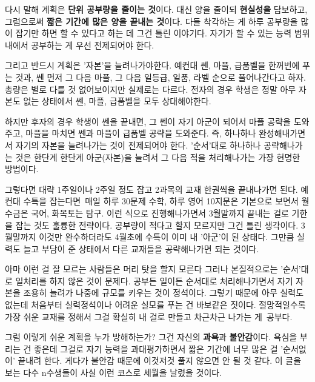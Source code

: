 다시 말해 계획은 \textbf{단위 공부량을 줄이는 것}이다.
대신 양을 줄이되 \textbf{현실성을} 담보하고, 그럼으로써 \textbf{짧은 기간에 많은 양을 끝내는 것}이다.
다들 착각하는 게 하루 공부량을 많이 잡기만 하면 할 수 있다고 하는 데 그건 틀린 이야기다.
자기가 할 수 있는 능력 범위 내에서 공부하는 게 우선 전제되어야 한다.
\vspace{5mm}

그리고 반드시 계획은 '자본'을 늘려나가야한다.
예컨대 쎈, 마플, 급품벨을 한꺼번에 푸는 것과, 쎈 먼저 그 다음 마플, 그 다음 일등급, 일품, 라벨 순으로 풀어나간다고 하자.
총량은 별로 다를 것 없어보이지만 실제로는 다르다.
전자의 경우 학생은 정말 아무 자본도 없는 상태에서 쎈, 마플, 급품벨을 모두 상대해야한다.
\vspace{5mm}

하지만 후자의 경우 학생이 쎈을 끝내면, 그 쎈이 자기 아군이 되어서 마플 공략을 도와주고, 마플을 마치면 쎈과 마플이 급품벨 공략을 도와준다.
즉, 하나하나 완성해내가면서 자기의 자본을 늘려나가는 것이 전제되어야 한다.
'순서'대로 하나하나 공략해나가는 것은 한단계 한단계 아군(자본)을 늘려서 그 다음 적을 처리해나가는 가장 현명한 방법이다.
\vspace{5mm}

그렇다면 대략 1주일이나 2주일 정도 잡고 2과목의 교재 한권씩을 끝내나가면 된다.
예컨대 수특을 잡는다면 매일 하루 30문제 수학, 하루 영어 10지문은 기본으로 보면서 월수금은 국어, 화목토는 탐구.
이런 식으로 진행해나가면서 3월말까지 끝내는 걸로 기한을 잡는 것도 훌륭한 전략이다.
공부량이 적다고 할지 모르지만 그건 틀린 생각이다. 3월말까지 이것만 완수하더라도 4월초에 수특이 이미 내 '아군'이 된 상태다.
그만큼 실력도 늘고 부담이 준 상태에서 다른 교재들을 공략해나가면 되는 것이다.
\vspace{5mm}

아마 이런 걸 잘 모르는 사람들은 머리 탓을 할지 모른다
그러나 본질적으로는 '순서'대로 일처리를 하지 않은 것이 문제다.
공부든 일이든 순서대로 처리해나가면서 자기 자본을 조용히 늘려가 나중에 규모를 키우는 것이 정석이다.
그렇기 때문에 아무 실력도 없는데 처음부터 실력정석이나 어려운 실모를 푸는 건 바보같은 짓이다.
절망적일수록 가장 쉬운 교재를 정해서 그걸 확실히 내 걸로 만들고 차근차근 나가는 게 공부다.
\vspace{5mm}

그럼 이렇게 쉬운 계획을 누가 방해하는가?
그건 자신의 \textbf{과욕}과 \textbf{불안감}이다.
욕심을 부리는 건 좋은데 그걸로 자기 능력을 과대평가하면서 짧은 기간에 너무 많은 걸 '순서없이' 끝내려 한다.
게다가 불안감 때문에 이것저것 풀지 않으면 안 될 것 같다.
이 글을 보는 다수 n수생들이 사실 이런 코스로 세월을 날렸을 것이다.
\vspace{5mm}

